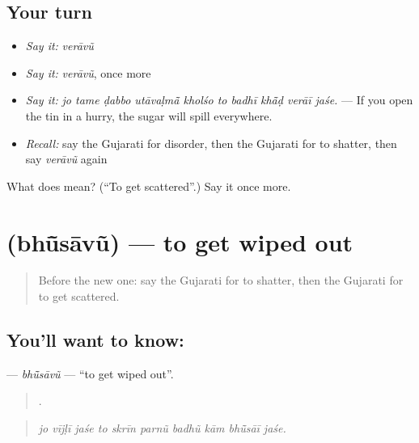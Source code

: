 \subsection*{Your turn}
\begin{itemize}
\raggedright
  \item \emph{Say it:} \emph{verāvũ}
  \item \emph{Say it:} \emph{verāvũ}, once more
  \item \emph{Say it:} \emph{jo tame ḍabbo utāvaḷmā̃ kholśo to badhī khā̃ḍ verāī jaśe.} — If you open the tin in a hurry, the sugar will spill everywhere.
  \item \emph{Recall:} say the Gujarati for disorder, then the Gujarati for to shatter, then say \emph{verāvũ} again
\end{itemize}

\begin{tcolorbox}[breakable,colback=teal!4,colframe=teal!35!black,title={Before you move on}]
What does  mean? (\textquotedblleft{}To get scattered\textquotedblright{}.) Say it once more.
\end{tcolorbox}
\section[\texorpdfstring{\gu{ભૂંસાવું} (bhū̃sāvũ)}{ભૂંસાવું (bhū̃sāvũ)}]{ (bhū̃sāvũ) — to get wiped out}

\label{lesson:GU-C391-bhusavu}



\begin{quote}
Before the new one: say the Gujarati for to shatter, then the Gujarati for to get scattered.
\end{quote}

\subsection*{You'll want to know: }
\textbf{} — \emph{bhū̃sāvũ} — \textquotedblleft{}to get wiped out\textquotedblright{}.

\begin{quote}
         .
\end{quote}

\begin{quote}
\emph{jo vījḷī jaśe to skrīn parnũ badhũ kām bhū̃sāī jaśe.}
\end{quote}


